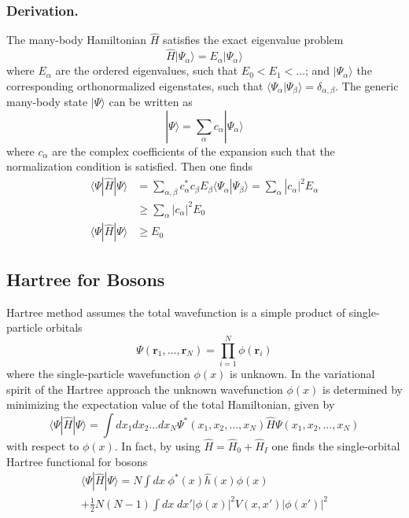 \documentclass[../../../main.tex]{subfiles}
\begin{document}
\subsubsection{Derivation.}
The many-body Hamiltonian $\hat{H}$ satisfies the exact eigenvalue problem
\begin{equation*}
  \hat{H}|\Psi_\alpha\rangle = E_\alpha |\Psi_\alpha\rangle
\end{equation*}
where $E_\alpha$ are the ordered eigenvalues, such that $E_0 < E_1 < \ldots$; and $|\Psi_\alpha\rangle$ the corresponding orthonormalized eigenstates, such that $\langle \Psi_\alpha|\Psi_\beta \rangle = \delta_{\alpha,\beta}$.
The generic many-body state $|\Psi\rangle$ can be written as
\begin{equation*}
  |\Psi\rangle = \sum_{\alpha} c_\alpha |\Psi_\alpha\rangle
\end{equation*}
where $c_\alpha$ are the complex coefficients of the expansion such that the normalization condition is satisfied.
Then one finds
\begin{align*}
  \langle \Psi | \hat{H} | \Psi \rangle
   & =  \sum_{\alpha,\beta} c_\alpha^* c_\beta E_\beta \langle \Psi_\alpha | \Psi_\beta \rangle = \sum_{\alpha} |c_\alpha|^2 E_\alpha \\
   & \geq \sum_{\alpha} |c_\alpha|^2 E_0                                                                                              \\
  \langle \Psi | \hat{H} | \Psi \rangle
   & \geq E_0
\end{align*}

\subsection{Hartree for Bosons}
Hartree method assumes the total wavefunction is a simple product of single-particle orbitals
\begin{equation*}
  \Psi(\mathbf{r}_1, \ldots, \mathbf{r}_N) = \prod_{i=1}^{N} \phi(\mathbf{r}_i)
\end{equation*}
where the single-particle wavefunction $\phi(x)$ is unknown.
In the variational spirit of the Hartree approach the unknown wavefunction $\phi(x)$ is determined by minimizing the expectation value of the total Hamiltonian, given by
\begin{equation*}
  \langle \Psi | \hat{H} | \Psi \rangle = \int dx_1 dx_2 \ldots dx_N \Psi^*(x_1, x_2, \ldots, x_N) \hat{H} \Psi(x_1, x_2, \ldots, x_N)
\end{equation*}
with respect to $\phi(x)$.
In fact, by using $\hat{H }=\hat{H}_0+\hat{H }_I$ one finds the single-orbital Hartree functional for bosons
\begin{multline*}
  \langle \Psi | \hat{H} | \Psi \rangle = N \int dx \; \phi^*(x) \hat{h}(x) \phi(x) \\
  + \frac{1}{2} N(N - 1) \int dx \; dx' |\phi(x)|^2 V(x, x') |\phi(x')|^2
\end{multline*}
\end{document}
